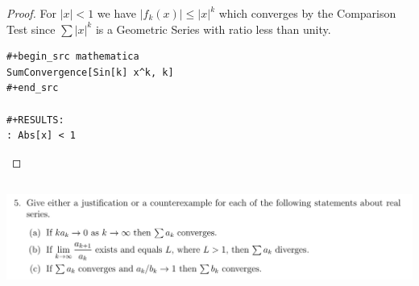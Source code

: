 \documentclass[12pt]{article}
\begin{document}
\begin{enumerate}[label=(\alph*)]
\begin{proof}
    For $|x| < 1$ we have $|f_k(x)| \leq |x|^k$ which converges by the Comparison Test since
    $\sum |x|^k$ is a Geometric Series with ratio less than unity.

\begin{verbatim}
#+begin_src mathematica
SumConvergence[Sin[k] x^k, k]
#+end_src

#+RESULTS:
: Abs[x] < 1

\end{verbatim}
\checkmark
  \end{proof}

\end{enumerate}


\newpage
\subsection{}


\begin{mdframed}
\includegraphics[width=400pt]{img/analysis--oxford-M2-I-6-5.png}
\end{mdframed}
\end{document}
